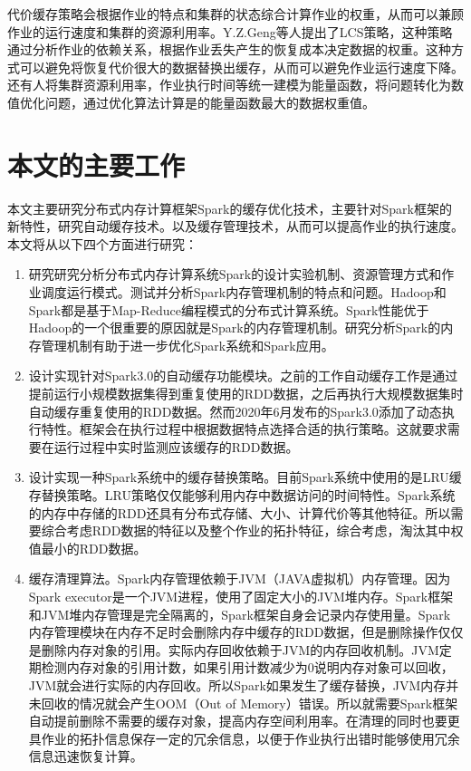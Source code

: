 代价缓存策略会根据作业的特点和集群的状态综合计算作业的权重，从而可以兼顾作业的运行速度和集群的资源利用率。Y.Z.Geng等人\cite{geng2014simulation}提出了LCS策略，这种策略通过分析作业的依赖关系，根据作业丢失产生的恢复成本决定数据的权重。这种方式可以避免将恢复代价很大的数据替换出缓存，从而可以避免作业运行速度下降。还有人将集群资源利用率，作业执行时间等统一建模为能量函数，将问题转化为数值优化问题，通过优化算法计算是的能量函数最大的数据权重值。

\section{本文的主要工作}

本文主要研究分布式内存计算框架Spark的缓存优化技术，主要针对Spark框架的新特性，研究自动缓存技术。以及缓存管理技术，从而可以提高作业的执行速度。本文将从以下四个方面进行研究：

\begin{enumerate}
    \item 研究研究分析分布式内存计算系统Spark的设计实验机制、资源管理方式和作业调度运行模式。测试并分析Spark内存管理机制的特点和问题。Hadoop和Spark都是基于Map-Reduce编程模式的分布式计算系统。Spark性能优于Hadoop的一个很重要的原因就是Spark的内存管理机制。研究分析Spark的内存管理机制有助于进一步优化Spark系统和Spark应用。
    \item 设计实现针对Spark3.0的自动缓存功能模块。之前的工作自动缓存工作是通过提前运行小规模数据集得到重复使用的RDD数据，之后再执行大规模数据集时自动缓存重复使用的RDD数据。然而2020年6月发布的Spark3.0添加了动态执行特性。框架会在执行过程中根据数据特点选择合适的执行策略。这就要求需要在运行过程中实时监测应该缓存的RDD数据。
    \item 设计实现一种Spark系统中的缓存替换策略。目前Spark系统中使用的是LRU缓存替换策略。LRU策略仅仅能够利用内存中数据访问的时间特性。Spark系统的内存中存储的RDD还具有分布式存储、大小、计算代价等其他特征。所以需要综合考虑RDD数据的特征以及整个作业的拓扑特征，综合考虑，淘汰其中权值最小的RDD数据。
    \item 缓存清理算法。Spark内存管理依赖于JVM（JAVA虚拟机）内存管理。因为Spark executor是一个JVM进程，使用了固定大小的JVM堆内存。Spark框架和JVM堆内存管理是完全隔离的，Spark框架自身会记录内存使用量。Spark
    内存管理模块在内存不足时会删除内存中缓存的RDD数据，但是删除操作仅仅是删除内存对象的引用。实际内存回收依赖于JVM的内存回收机制。JVM定期检测内存对象的引用计数，如果引用计数减少为0说明内存对象可以回收，JVM就会进行实际的内存回收。所以Spark如果发生了缓存替换，JVM内存并未回收的情况就会产生OOM（Out of Memory）错误。所以就需要Spark框架自动提前删除不需要的缓存对象，提高内存空间利用率。在清理的同时也要更具作业的拓扑信息保存一定的冗余信息，以便于作业执行出错时能够使用冗余信息迅速恢复计算。
\end{enumerate}

